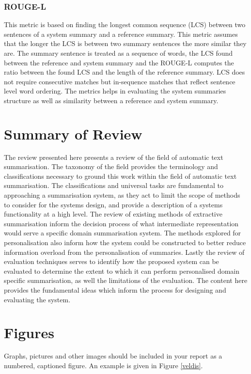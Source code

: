 \subsubsection{ROUGE-L}
This metric is based on finding the longest common sequence (LCS) between two sentences of a system summary and a reference summary. This metric assumes that the longer the LCS is between two summary sentences the more similar they are. The summary sentence is treated as a sequence of words, the LCS found between the reference and system summary and the ROUGE-L computes the ratio between the found LCS and the length of the reference summary. LCS does not require consecutive matches but in-sequence matches that reflect sentence level word ordering. The metrics helps in evaluating the system summaries structure as well as similarity between a reference and system summary.

\section{Summary of Review}
The review presented here presents a review of the field of automatic text summarisation. The taxonomy of the field provides the terminology and classifications necessary to ground this work within the field of automatic text summarisation. The classifications and universal tasks are fundamental to approaching a summarisation system, as they act to limit the scope of methods to consider for the systems design, and provide a description of a systems functionality at a high level. The review of existing methods of extractive summarisation inform the decision process of what intermediate representation would serve a specific domain summarisation system. The methods explored for personalisation also inform how the system could be constructed to better reduce information overload from the personalisation of summaries. Lastly the review of evaluation techniques serves to identify how the proposed system can be evaluated to determine the extent to which it can perform personalised domain specific summarisation, as well the limitations of the evaluation. The content here provides the fundamental ideas which inform the process for designing and evaluating the system. 

\section{Figures}
Graphs, pictures and other images should be included in your report as a numbered, captioned figure. An example is given in Figure \ref{veldis}.

